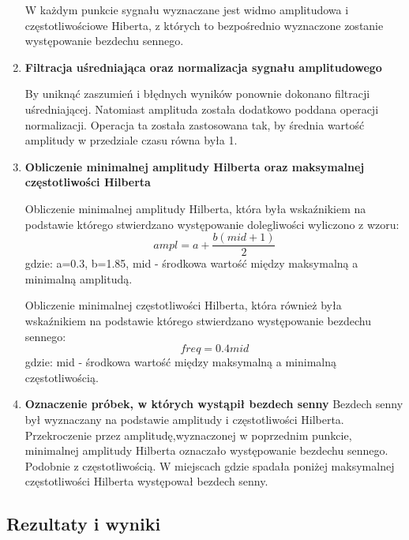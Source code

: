 \begin{enumerate}
 W każdym punkcie sygnału wyznaczane jest widmo amplitudowa i częstotliwościowe Hiberta, z których to bezpośrednio wyznaczone zostanie występowanie bezdechu sennego.
 \item \textbf{Filtracja uśredniająca oraz normalizacja sygnału amplitudowego}
 
 By uniknąć zaszumień i błędnych wyników ponownie dokonano filtracji uśredniającej. Natomiast amplituda została dodatkowo poddana operacji normalizacji. Operacja ta została zastosowana tak, by średnia wartość amplitudy w przedziale czasu równa była 1.
 \item \textbf{Obliczenie minimalnej amplitudy Hilberta oraz maksymalnej częstotliwości Hilberta}
 
 Obliczenie minimalnej amplitudy Hilberta, która była wskaźnikiem na podstawie którego stwierdzano występowanie dolegliwości wyliczono z wzoru:
 \begin{equation}
 ampl = a+\frac{b(mid +1)}{2}
 \end{equation}
  gdzie: a=0.3, b=1.85, mid - środkowa wartość między maksymalną a minimalną amplitudą.
  
 Obliczenie minimalnej częstotliwości Hilberta, która również była wskaźnikiem na podstawie którego stwierdzano występowanie bezdechu sennego:
 \begin{equation}
 freq = 0.4mid
 \end{equation}
  gdzie: mid - środkowa wartość między maksymalną a minimalną częstotliwością.
 \item \textbf{Oznaczenie próbek, w których wystąpił bezdech senny}
 Bezdech senny był wyznaczany na podstawie amplitudy i częstotliwości Hilberta. Przekroczenie przez amplitudę,wyznaczonej w poprzednim punkcie, minimalnej amplitudy Hilberta oznaczało występowanie bezdechu sennego. Podobnie z częstotliwością. W miejscach gdzie spadała poniżej maksymalnej częstotliwości Hilberta występował bezdech senny.
\end{enumerate}

\subsection{Rezultaty i wyniki}

